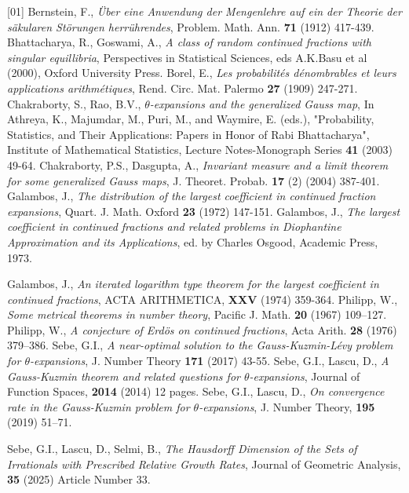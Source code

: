\documentclass[final,1p,times]{elsarticle}
\numberwithin{equation}{section}
\begin{document}


\begin{thebibliography}{[01]}
%
 Bernstein, F., \textit{\"Uber eine Anwendung der Mengenlehre auf ein der Theorie der s\"akularen St\"orungen herr\"uhrendes}, Problem. Math. Ann. \textbf{71} (1912) 417-439.
%
 Bhattacharya, R., Goswami, A., \textit{A class of random continued fractions with singular equillibria}, Perspectives in Statistical Sciences, eds A.K.Basu et al (2000), Oxford University Press.
%
 Borel, E., \textit{Les probabilit\'es d\'enombrables et leurs applications arithm\'etiques}, Rend. Circ. Mat. Palermo \textbf{27} (1909) 247-271.
%
 Chakraborty, S., Rao, B.V., \textit{$\theta$-expansions and the generalized Gauss map},
In Athreya, K., Majumdar, M., Puri, M., and Waymire, E. (eds.), "Probability, Statistics, and
Their Applications: Papers in Honor of Rabi Bhattacharya", Institute of Mathematical
Statistics, Lecture Notes-Monograph Series \textbf{41} (2003) 49-64.
%
 Chakraborty, P.S., Dasgupta, A., \textit{Invariant measure and a limit theorem for some generalized Gauss maps}, J. Theoret. Probab. \textbf{17} (2) (2004) 387-401.
%
 Galambos, J., \textit{The distribution of the largest coefficient in continued fraction expansions}, Quart. J. Math. Oxford \textbf{23} (1972) 147-151.
%
 Galambos, J., \textit{The largest coefficient in continued fractions and related problems in Diophantine Approximation  and its Applications}, ed. by Charles Osgood, Academic Press, 1973.

 Galambos, J.,  \textit{An iterated logarithm type theorem for the largest coefficient in continued fractions}, ACTA ARITHMETICA, {\bf XXV} (1974) 359-364.
%
 Philipp, W., \textit{Some metrical theorems in number theory}, Pacific J. Math. \textbf{20} (1967) 109--127.
%
 Philipp, W., \textit{A conjecture of Erd\"os on continued fractions},
Acta Arith. \textbf{28} (1976) 379--386.
%
 Sebe, G.I., \textit{A near-optimal solution to the Gauss-Kuzmin-L\'evy problem for $\theta$-expansions}, J. Number Theory \textbf{171} (2017) 43-55.
%
 Sebe, G.I., Lascu, D., \textit{A Gauss-Kuzmin theorem and related questions for $\theta$-expansions}, Journal of Function Spaces, \textbf{2014} (2014) 12 pages.
 Sebe, G.I., Lascu, D., \textit{On convergence rate in the Gauss-Kuzmin problem for $\theta$-expansions}, J. Number Theory, \textbf{195} (2019) 51--71.
%

 Sebe, G.I., Lascu, D., Selmi, B., \textit{The Hausdorff Dimension of the Sets of Irrationals with Prescribed Relative Growth Rates}, Journal of Geometric Analysis, \textbf{35} (2025) Article Number 33.
\end{thebibliography}
\end{document}
